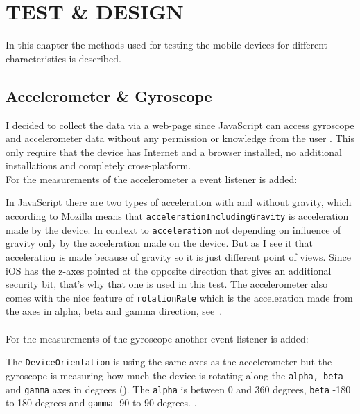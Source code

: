 \chapter{TEST \& DESIGN}\label{cha:test}
In this chapter the methods used for testing the mobile devices for different characteristics is described. 

\section{Accelerometer \& Gyroscope}\label{sec:test:motion}
I decided to collect the data via a web-page since JavaScript can access gyroscope and accelerometer data without any permission or knowledge from the user \cite[]{sensor:DeviceOrientation:spec}. This only require that the device has Internet and a browser installed, no additional installations and completely cross-platform. \\


For the measurements of the accelerometer a event listener is added:

In JavaScript there are two types of acceleration with and without gravity, which according to Mozilla means that \texttt{accelerationIncludingGravity} is acceleration made by the device. In context to \texttt{acceleration} not depending on influence of gravity only by the acceleration made on the device. But as I see it that acceleration is made because of gravity so it is just different point of views. Since iOS has the z-axes pointed at the opposite direction that gives an additional security bit, that's why that one is used in this test. The accelerometer also comes with the nice feature of \texttt{rotationRate} which is the acceleration made from the axes in alpha, beta and gamma direction, see~. \cite[]{sensor:accIncludingGravity} \\
\\
For the measurements of the gyroscope another event listener is added:

The \texttt{DeviceOrientation} is using the same axes as the accelerometer but the gyroscope is measuring how much the device is rotating along the \texttt{alpha, beta} and \texttt{gamma} axes in degrees (). The \texttt{alpha} is between 0 and 360 degrees, \texttt{beta} -180 to 180 degrees and \texttt{gamma} -90 to 90 degrees. \citet{sensor:DeviceOrientation:spec}.

